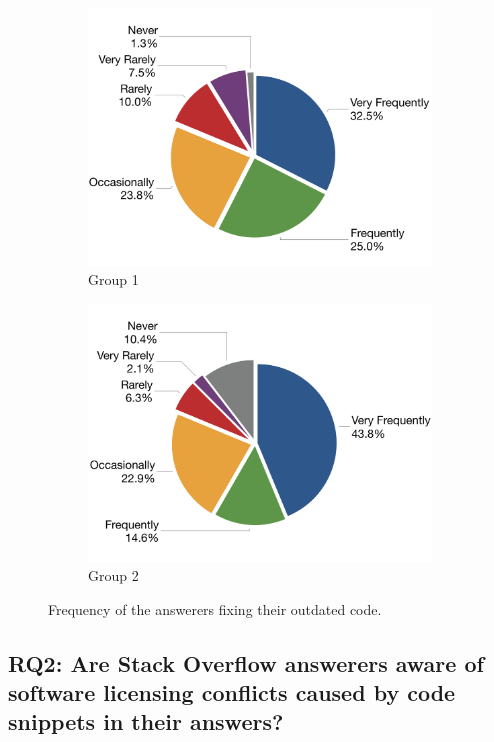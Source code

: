 \documentclass{svjour3}                     %
\begin{document}
\begin{figure}
	\begin{subfigure}{.5\textwidth}
		\centering
		\includegraphics[width=.9\linewidth]{survey_outdated_fix_1}
		\caption{Group 1}
		\label{fig:survey_outdated_fix_1}
	\end{subfigure}%
	\begin{subfigure}{.5\textwidth}
		\centering
		\includegraphics[width=.9\linewidth]{survey_outdated_fix_2}
		\caption{Group 2}
		\label{fig:survey_outdated_fix_2}
	\end{subfigure}
	\caption{Frequency of the answerers fixing their outdated code.}
	\label{fig:survey_outdated_fix}
\end{figure}

\subsection{RQ2: Are Stack Overflow answerers aware of software licensing conflicts caused by code snippets in their answers?} 
\end{document}
